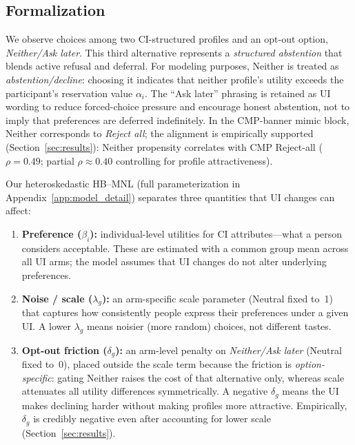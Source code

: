\documentclass{eusset}
\begin{document}
\subsection{Formalization}
We observe choices among two CI-structured profiles and an opt-out option, \emph{Neither/Ask later}. This third alternative represents a \emph{structured abstention} that blends active refusal and deferral. For modeling purposes, Neither is treated as \emph{abstention/decline}: choosing it indicates that neither profile's utility exceeds the participant's reservation value $\alpha_i$. The ``Ask later'' phrasing is retained as UI wording to reduce forced-choice pressure and encourage honest abstention, not to imply that preferences are deferred indefinitely. In the CMP-banner mimic block, Neither corresponds to \emph{Reject all}; the alignment is empirically supported (Section~\ref{sec:results}): Neither propensity correlates with CMP Reject-all ($\rho = 0.49$; partial $\rho \approx 0.40$ controlling for profile attractiveness).

Our heteroskedastic HB--MNL (full parameterization in Appendix~\ref{app:model_detail}) separates three quantities that UI changes can affect:
\begin{enumerate}
\item \textbf{Preference ($\beta_i$):} individual-level utilities for CI attributes---what a person considers acceptable. These are estimated with a common group mean across all UI arms; the model assumes that UI changes do not alter underlying preferences.
\item \textbf{Noise / scale ($\lambda_g$):} an arm-specific scale parameter (Neutral fixed to~1) that captures how consistently people express their preferences under a given UI. A lower $\lambda_g$ means noisier (more random) choices, not different tastes.
\item \textbf{Opt-out friction ($\delta_g$):} an arm-level penalty on \emph{Neither/Ask later} (Neutral fixed to~0), placed outside the scale term because the friction is \emph{option-specific}: gating Neither raises the cost of that alternative only, whereas scale attenuates all utility differences symmetrically. A negative $\delta_g$ means the UI makes declining harder without making profiles more attractive. Empirically, $\delta_g$ is credibly negative even after accounting for lower scale (Section~\ref{sec:results}).
\end{enumerate}
\end{document}
